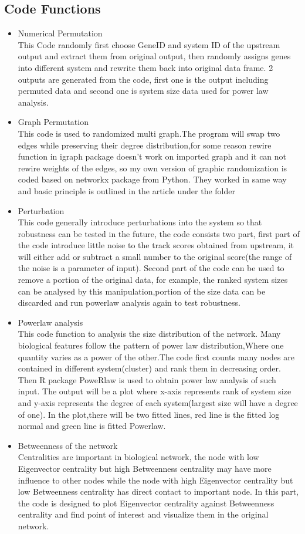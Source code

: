 \documentclass[doublespaced, 12pt]{article}
\begin{document}
\subsection{Code Functions}
\begin{itemize}
	\item Numerical Permutation \\ This Code randomly first choose GeneID and system ID of the upstream output and extract them from original output, then randomly assigns genes into different system and rewrite them back into original data frame. 2 outputs are generated from the code, first one is the output including permuted data and second one is system size data used for power law analysis. 
	\item Graph Permutation \\ This code is used to randomized multi graph.The program will swap two edges while preserving their degree distribution,for some reason rewire function in igraph package doesn't work on imported graph and it can not rewire weights of the edges, so my own version of graphic randomization is coded based on networkx package from Python. They worked in same way and basic principle is outlined in the article under the folder 
	\item Perturbation \\This code generally introduce perturbations into the system so that robustness can be tested in the future, the code consists two part, first part of the code introduce little noise to the track scores obtained from upstream, it will either add or subtract a small number to the original score(the range of the noise is a parameter of input). Second part of the code can be used to remove a portion of the original data, for example, the ranked system sizes can be analysed by this manipulation,portion of the size data can be discarded and run powerlaw analysis again to test robustness.
	\item Powerlaw analysis \\ This code function to analysis the size distribution of the network. Many biological features follow the pattern of power law distribution,Where one quantity varies as a power of the other.The code first counts many nodes are contained in different system(cluster) and rank them in decreasing order. Then R package PoweRlaw is used to obtain power law analysis of such input. The output will be a plot where x-axis represents rank of system size and y-axis represents the degree of each system(largest size will have a degree of one). In the plot,there will be two fitted lines, red line is the fitted log normal and green line is fitted Powerlaw.
	\item Betweenness of the network \\ Centralities are important in biological network, the node with low Eigenvector centrality but high Betweenness centrality may have more influence to other nodes while the node with high Eigenvector centrality but low Betweenness centrality has direct contact to important node. In this part, the code is designed to plot Eigenvector centrality against Betweenness centrality and find point of interest and visualize them in the original network.
\end{itemize}
\end{document}
